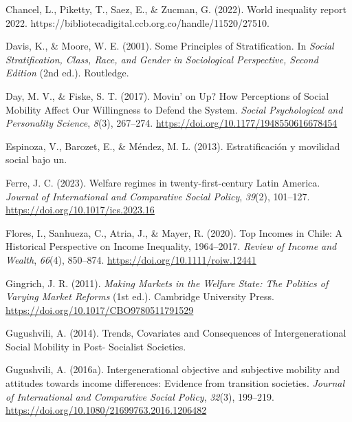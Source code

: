 \documentclass[
  12pt,
]{article}
\newlength{\cslhangindent}
\newenvironment{CSLReferences}[2] %
 {\begin{list}{}{%
  \setlength{\itemindent}{0pt}
  \setlength{\leftmargin}{0pt}
  \setlength{\parsep}{0pt}
  \ifodd #1
   \setlength{\leftmargin}{\cslhangindent}
   \setlength{\itemindent}{-1\cslhangindent}
  \fi
  \setlength{\itemsep}{#2\baselineskip}}}
 {\end{list}}
\begin{document}
\begin{CSLReferences}{1}{0}
Chancel, L., Piketty, T., Saez, E., \& Zucman, G. (2022). World
inequality report 2022.
https://bibliotecadigital.ccb.org.co/handle/11520/27510.

Davis, K., \& Moore, W. E. (2001). Some {Principles} of
{Stratification}. In \emph{Social {Stratification}, {Class}, {Race}, and
{Gender} in {Sociological Perspective}, {Second Edition}} (2nd ed.).
Routledge.

Day, M. V., \& Fiske, S. T. (2017). Movin' on {Up}? {How Perceptions} of
{Social Mobility Affect Our Willingness} to {Defend} the {System}.
\emph{Social Psychological and Personality Science}, \emph{8}(3),
267--274. \url{https://doi.org/10.1177/1948550616678454}

Espinoza, V., Barozet, E., \& Méndez, M. L. (2013). {Estratificaci{ó}n y
movilidad social bajo un}.

Ferre, J. C. (2023). Welfare regimes in twenty-first-century {Latin
America}. \emph{Journal of International and Comparative Social Policy},
\emph{39}(2), 101--127. \url{https://doi.org/10.1017/ics.2023.16}

Flores, I., Sanhueza, C., Atria, J., \& Mayer, R. (2020). Top {Incomes}
in {Chile}: {A Historical Perspective} on {Income Inequality},
1964--2017. \emph{Review of Income and Wealth}, \emph{66}(4), 850--874.
\url{https://doi.org/10.1111/roiw.12441}

Gingrich, J. R. (2011). \emph{Making {Markets} in the {Welfare State}:
{The Politics} of {Varying Market Reforms}} (1st ed.). Cambridge
University Press. \url{https://doi.org/10.1017/CBO9780511791529}

Gugushvili, A. (2014). Trends, {Covariates} and {Consequences} of
{Intergenerational Social Mobility} in {Post- Socialist Societies}.

Gugushvili, A. (2016a). Intergenerational objective and subjective
mobility and attitudes towards income differences: Evidence from
transition societies. \emph{Journal of International and Comparative
Social Policy}, \emph{32}(3), 199--219.
\url{https://doi.org/10.1080/21699763.2016.1206482}


\end{CSLReferences}
\end{document}
